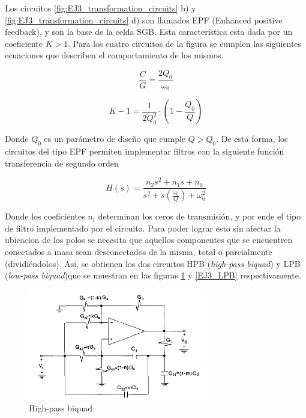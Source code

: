 Los circuitos \ref{fig:EJ3_transformation_circuits} b) y \ref{fig:EJ3_transformation_circuits} d) son llamados EPF (Enhanced positive feedback), y son la base de la celda SGB. Esta caracter\'istica esta dada por un coeficiente $K>1$. Para los cuatro circuitos de la figura se cumplen las siguientes ecuaciones que describen el comportamiento de los mismos.

\begin{equation}\label{EJ3eq1}
\frac{C}{G} = \frac{2Q_0}{\omega_0}
\end{equation}

\begin{equation}\label{EJ3eq2}
K-1 = \frac{1}{2Q_0^2}\cdot \left( 1-\frac{Q_0}{Q} \right)
\end{equation}

Donde $Q_0$ es un par\'ametro de dise\~no que cumple $Q>Q_0$. De esta forma, los circuitos del tipo EPF permiten implementar filtros con la siguiente funci\'on transferencia de segundo orden

\begin{equation}
\label{transf}
H(s)=\frac{n_2s^2+n_1s+n_0}{s^2+s\left(\frac{\omega_0}{Q}\right)+\omega_0^2}
\end{equation}

Donde los coeficientes $n_i$ determinan los ceros de transmisi\'on, y por ende el tipo de filtro implementado por el circuito. Para poder lograr esto sin afectar la ubicacion de los polos se necesita que aquellos componentes que se encuentren conectados a masa sean desconectados de la misma, total o parcialmente (dividi\'endolos). Asi, se obtienen los dos circuitos HPB (\textit{high-pass biquad}) y LPB (\textit{low-pass biquad})que se muestran en las figuras \ref{EJ3_HPB} y \ref{EJ3_LPB} respectivamente.

\begin{figure}[H]
    \centering
    \includegraphics[width=0.7\textwidth]{../EJ3/Resources/HPB.png}
    \caption{High-pass biquad}
     \label{EJ3_HPB}
\end{figure}

